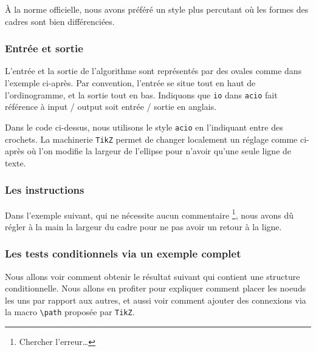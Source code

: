 \documentclass[12pt,a4paper]{article}
\theoremstyle{definition}
\begin{document}
À la norme officielle, nous avons préféré un style plus percutant où les formes des cadres sont bien différenciées.




\subsubsection{Entrée et sortie}

L'entrée et la sortie de l'algorithme sont représentés par des ovales comme dans l'exemple ci-après. Par convention, l'entrée se situe tout en haut de l'ordinogramme, et la sortie tout en bas.
Indiquons que \verb+io+ dans \verb+acio+ fait référence à \og input / output \fg{} soit \og entrée / sortie \fg{} en anglais.



Dans le code ci-dessus, nous utilisons le style \verb+acio+ en l'indiquant entre des crochets.
La machinerie \verb#TikZ# permet de changer localement un réglage comme ci-après où l'on modifie la largeur de l'ellipse pour n'avoir qu'une seule ligne de texte.





\subsubsection{Les instructions}

Dans l'exemple suivant, qui ne nécessite aucun commentaire
\footnote{
	Chercher l'erreur\dots
},
nous avons dû régler à la main la largeur du cadre pour ne pas avoir un retour à la ligne.






\subsubsection{Les tests conditionnels via un exemple complet}

Nous allons voir comment obtenir le résultat suivant qui contient une structure conditionnelle. Nous allons en profiter pour expliquer comment placer les noeuds les uns par rapport aux autres, et aussi voir comment ajouter des connexions via la macro \verb+\path+ proposée par \verb#TikZ#.


\begin{center}
    \small
    
\end{center}
\end{document}
